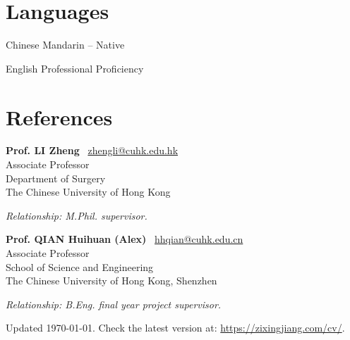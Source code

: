 \documentclass[11pt,letterpaper]{report}
\newcommand{\listitemspace}{0.25em}
\renewenvironment{itemize}
{\begin{list}{}{\setlength{\leftmargin}{0em}
			\setlength{\parskip}{0em}
			\setlength{\itemsep}{\listitemspace}
			\setlength{\parsep}{\listitemspace}}}
	{\end{list}}
\begin{document}
\section*{Languages}
\begin{tablist}
	\item[Chinese] \tab Mandarin -- Native
	\item[English] \tab Professional Proficiency
\end{tablist}
\newpage
\section*{References}
\begin{itemize}
	\item \textbf{Prof. LI Zheng} ~{\scriptsize \faEnvelope}\href{mailto:zhengli@cuhk.edu.hk}{zhengli@cuhk.edu.hk}\\
	Associate Professor\\
	Department of Surgery\\
	The Chinese University of Hong Kong
	
	\textit{Relationship: M.Phil. supervisor.}

	\vspace{1ex}
	
	\item \textbf{Prof. QIAN Huihuan (Alex)} ~{\scriptsize \faEnvelope}\href{mailto:hhqian@cuhk.edu.cn}{hhqian@cuhk.edu.cn}\\
	Associate Professor\\School of Science and Engineering\\The Chinese University of Hong Kong, Shenzhen

	\textit{Relationship: B.Eng. final year project supervisor.}

\end{itemize}
	
\begin{center}
	\vfill
	Updated \monthyeardate\today. Check the latest version at:  \href{https://zixingjiang.com/cv/}{https://zixingjiang.com/cv/}.
\end{center}
	
\end{document}
